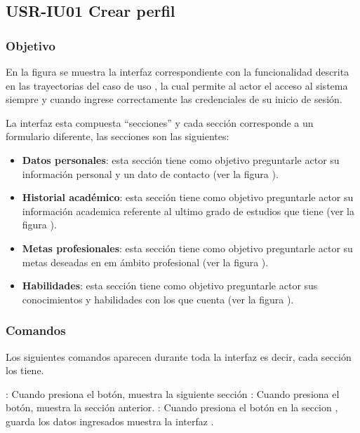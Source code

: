 \clearpage
\subsection{USR-IU01 Crear perfil}

\subsubsection{Objetivo}
En la figura  se muestra la interfaz correspondiente con la funcionalidad descrita en las
trayectorias del caso de uso  , la cual permite al actor el acceso al sistema
siempre y cuando ingrese correctamente las credenciales de su inicio de sesión.

La interfaz esta compuesta ``secciones'' y cada sección corresponde a un formulario diferente, las secciones
son las siguientes:
\begin{itemize}
   \item \textbf{Datos personales}: esta sección tiene como objetivo preguntarle actor su información
   personal y un dato de contacto (ver la figura ).
   \item \textbf{Historial académico}: esta sección tiene como objetivo preguntarle actor su información
   academica referente al ultimo grado de estudios que tiene (ver la figura ).
   \item \textbf{Metas profesionales}: esta sección tiene como objetivo preguntarle actor su metas deseadas
   en em ámbito profesional (ver la figura ).
   \item \textbf{Habilidades}: esta sección tiene como objetivo preguntarle actor sus conocimientos
   y habilidades con los que cuenta (ver la figura ).
\end{itemize}

\subsubsection{Comandos}
Los siguientes comandos aparecen durante toda la interfaz es decir, cada sección los tiene.


\Titem {} : Cuando presiona el botón, muestra la siguiente sección %
\Titem {} : Cuando presiona el botón, muestra la sección anterior.%
\Titem {} : Cuando presiona el botón en la seccion  , guarda los datos ingresados muestra la interfaz .



\clearpage

